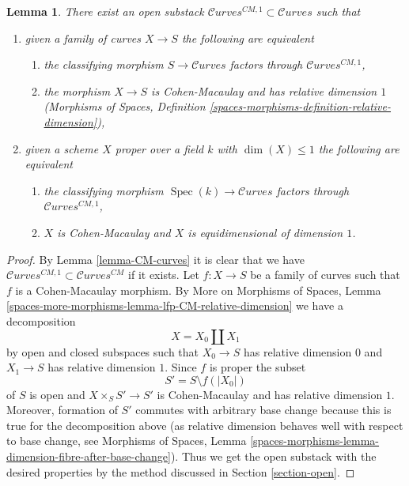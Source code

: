 \documentclass{stacks-project}
\theoremstyle{plain}
\newtheorem{lemma}[subsection]{Lemma}
\theoremstyle{definition}
\theoremstyle{remark}
\numberwithin{equation}{subsection}
\def\Spec{\mathop{\mathrm{Spec}}}
\def\Curvesstack{\mathcal{C}\!\mathit{urves}}
\begin{document}
\begin{lemma}
\label{lemma-CM-1-curves}
There exist an open substack $\Curvesstack^{CM, 1} \subset \Curvesstack$
such that
\begin{enumerate}
\item given a family of curves $X \to S$ the following are equivalent
\begin{enumerate}
\item the classifying morphism $S \to \Curvesstack$ factors
through $\Curvesstack^{CM, 1}$,
\item the morphism $X \to S$ is Cohen-Macaulay and has
relative dimension $1$ (Morphisms of Spaces, Definition
\ref{spaces-morphisms-definition-relative-dimension}),
\end{enumerate}
\item given a scheme $X$ proper over a field $k$ with $\dim(X) \leq 1$
the following are equivalent
\begin{enumerate}
\item the classifying morphism $\Spec(k) \to \Curvesstack$ factors
through $\Curvesstack^{CM, 1}$,
\item $X$ is Cohen-Macaulay and $X$ is equidimensional of
dimension $1$.
\end{enumerate}
\end{enumerate}
\end{lemma}

\begin{proof}
By Lemma \ref{lemma-CM-curves} it is clear that we have
$\Curvesstack^{CM, 1} \subset \Curvesstack^{CM}$
if it exists. Let $f : X \to S$ be a family of curves
such that $f$ is a Cohen-Macaulay morphism. By
More on Morphisms of Spaces, Lemma
\ref{spaces-more-morphisms-lemma-lfp-CM-relative-dimension}
we have a decomposition
$$
X = X_0 \amalg X_1
$$
by open and closed subspaces such that $X_0 \to S$ has relative
dimension $0$ and $X_1 \to S$ has relative dimension $1$.
Since $f$ is proper the subset
$$
S' = S \setminus f(|X_0|)
$$
of $S$ is open and $X \times_S S' \to S'$ is Cohen-Macaulay
and has relative dimension $1$.
Moreover, formation of $S'$ commutes with arbitrary base
change because this is true for the decomposition above
(as relative dimension behaves well with respect to base
change, see Morphisms of Spaces, Lemma
\ref{spaces-morphisms-lemma-dimension-fibre-after-base-change}).
Thus we get the open substack with the desired properties
by the method discussed in Section \ref{section-open}.
\end{proof}
\end{document}
